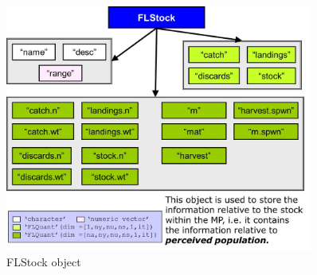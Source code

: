 \begin{figure}[!h]
  \centering
    \includegraphics[width= 0.9\textwidth]{FLStock}
  \caption{FLStock object}
  \label{fig:FLStock}
\end{figure}